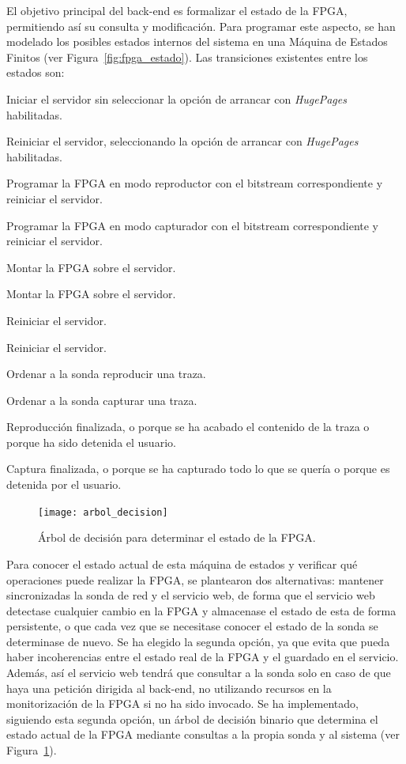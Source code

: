 El objetivo principal del \gls{back-end} es formalizar el estado de la \gls{FPGA}, permitiendo así su consulta y modificación.
Para programar este aspecto, se han modelado los posibles estados internos del sistema en una Máquina de Estados Finitos (ver Figura~\ref{fig:fpga_estado}).
Las transiciones existentes entre los estados son:
\begin{enumerate}[label={\bfseries [\arabic*]}]
  \item Iniciar el servidor sin seleccionar la opción de arrancar con \textit{HugePages} habilitadas.
  \item Reiniciar el servidor, seleccionando la opción de arrancar con \textit{HugePages} habilitadas.
  \item Programar la \gls{FPGA} en modo reproductor con el \gls{bitstream} correspondiente y reiniciar el servidor.
  \item Programar la \gls{FPGA} en modo capturador con el \gls{bitstream} correspondiente y reiniciar el servidor.
  \item Montar la \gls{FPGA} sobre el servidor.
  \item Montar la \gls{FPGA} sobre el servidor.
  \item Reiniciar el servidor.
  \item Reiniciar el servidor.
  \item Ordenar a la sonda reproducir una \gls{traza}.
  \item Ordenar a la sonda capturar una \gls{traza}.
  \item Reproducción finalizada, o porque se ha acabado el contenido de la \gls{traza} o porque ha sido detenida el usuario.
  \item Captura finalizada, o porque se ha capturado todo lo que se quería o porque es detenida por el usuario.
\end{enumerate}

\begin{figure}[!htp]
  \centering
  \texttt{[image: arbol\_decision]}
  \caption{Árbol de decisión para determinar el estado de la \gls{FPGA}.}
  \label{fig:arbol_decision}
\end{figure}

Para conocer el estado actual de esta máquina de estados y verificar qué operaciones puede realizar la \gls{FPGA}, se plantearon dos alternativas: mantener sincronizadas la sonda de red y el servicio web, de forma que el servicio web detectase cualquier cambio en la \gls{FPGA} y almacenase el estado de esta de forma persistente, o que cada vez que se necesitase conocer el estado de la sonda se determinase de nuevo.
Se ha elegido la segunda opción, ya que evita que pueda haber incoherencias entre el estado real de la \gls{FPGA} y el guardado en el servicio.
Además, así el servicio web tendrá que consultar a la sonda solo en caso de que haya una petición dirigida al \gls{back-end}, no utilizando recursos en la monitorización de la \gls{FPGA} si no ha sido invocado.
Se ha implementado, siguiendo esta segunda opción, un árbol de decisión binario que determina el estado actual de la \gls{FPGA} mediante consultas a la propia sonda y al sistema (ver Figura~\ref{fig:arbol_decision}).

